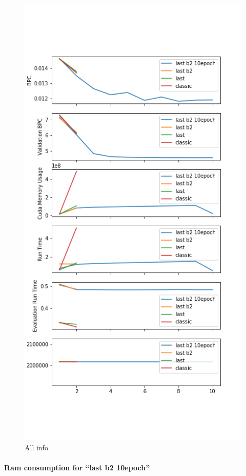 \begin{figure}[h]
\centering
\includegraphics{parts/appendix/reports-gmsnn/docs_esteban-latex/test_reports/2018-06-12/history_frac.png}
\caption{All info}
\end{figure}

\paragraph{\texorpdfstring{Ram consumption for ``last b2 10epoch''}{Ram consumption for last b2 10epoch}}

